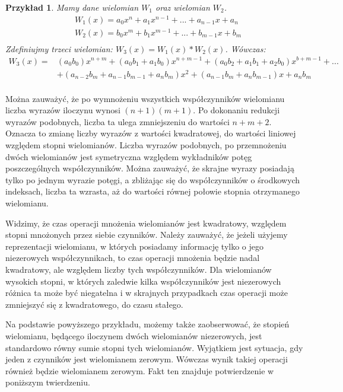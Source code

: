 \documentclass[twoside,a4paper]{book}
\newtheorem{example}{Przykład}
\begin{document}
\begin{example}
	Mamy dane wielomian $W_1$ oraz wielomian $W_2$.
	\begin{equation}
	\begin{split}
	&W_1(x) = a_0x^n + a_1x^{n-1} + ... + a_{n-1}x + a_n \\
	&W_2(x) = b_0x^m + b_1x^{m-1} + ... + b_{m-1}x + b_m \\
	\end{split}
	\end{equation}
	Zdefiniujmy trzeci wielomian: $W_3(x) = W_1(x) * W_2(x)$. Wówczas:
	\begin{equation}
		\begin{split}
		W_3(x) = &(a_0b_0)x^{n+m} + (a_0b_1+a_1b_0)x^{n+m-1} + (a_0b_2+a_1b_1+a_2b_0)x^{b+m-1} + ... \\
		&+ (a_{n-2}b_m+a_{n-1}b_{m-1}+a_nb_m)x^2 + (a_{n-1}b_m + a_nb_{m-1})x + a_nb_m \\
		\end{split}
	\end{equation}
\end{example}

Można zauważyć, że po wymnożeniu wszystkich współczynników wielomianu liczba wyrazów iloczynu wynosi $(n+1)(m+1)$. Po dokonaniu redukcji wyrazów podobnych, liczba ta ulega zmniejszeniu do wartości $n+m+2$. Oznacza to zmianę liczby wyrazów z wartości kwadratowej, do wartości liniowej względem stopni wielomianów. Liczba wyrazów podobnych, po przemnożeniu dwóch wielomianów jest symetryczna względem wykładników potęg poszczególnych współczynników. Można zauważyć, że skrajne wyrazy posiadają tylko po jednym wyrazie potęgi, a zbliżając się do współczynników o środkowych indeksach, liczba ta wzrasta, aż do wartości równej połowie stopnia otrzymanego wielomianu.

Widzimy, że czas operacji mnożenia wielomianów jest kwadratowy, względem stopni mnożonych przez siebie czynników. Należy zauważyć, że jeżeli użyjemy reprezentacji wielomianu, w których posiadamy informację tylko o jego niezerowych współczynnikach, to czas operacji mnożenia będzie nadal kwadratowy, ale względem liczby tych współczynników. Dla wielomianów wysokich stopni, w których zaledwie kilka współczynników jest niezerowych różnica ta może być niegatelna i w skrajnych przypadkach czas operacji może zmniejszyć się z kwadratowego, do czasu stałego.

Na podstawie powyższego przykładu, możemy także zaobserwować, że stopień wielomianu, będącego iloczynem dwóch wielomianów niezerowych, jest standardowo równy sumie stopni tych wielomianów. Wyjątkiem jest sytuacja, gdy jeden z czynników jest wielomianem zerowym. Wówczas wynik takiej operacji również będzie wielomianem zerowym. Fakt ten znajduje potwierdzenie w poniższym twierdzeniu.
\end{document}
